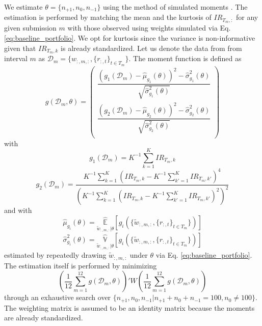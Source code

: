 \documentclass[3p,times,twocolumn]{elsarticle}
\begin{document}
We estimate $\theta=\{ n_{+1}, n_{0}, n_{-1}\}$ using the method of simulated moments \citep{mcfaddenMethodSimulatedMoments1989}.
The estimation is performed by matching the mean and the kurtosis of $IR_{T_{m},:}$ for any given submission $m$ with those observed using weights simulated via Eq. \ref{eq:baseline_portfolio}.
We opt for kurtosis since the variance is non-informative given that $IR_{T_{m},k}$ is already standardized.
Let us denote the data from from interval $m$ as $\mathcal{D}_{m}=\{w_{:,m,:}, \{r_{:,t}\}_{t\in T_{m}}\}$.
The moment function is defined as
\begin{equation}
    g(\mathcal{D}_{m},\theta)=
    \begin{pmatrix}
        \dfrac{\left(g_{1}(\mathcal{D}_{m})- \hat{\mu}_{g_{1}}(\theta)\right)^2 - \hat{\sigma}^{2}_{g_{1}}(\theta)}{\sqrt{\hat{\sigma}^{2}_{g_{1}}(\theta)}} \\
        \dfrac{\left(g_{2}(\mathcal{D}_{m})- \hat{\mu}_{g_{2}}(\theta)\right)^2 - \hat{\sigma}^{2}_{g_{2}}(\theta)}{\sqrt{\hat{\sigma}^{2}_{g_{2}}(\theta)}} \\
    \end{pmatrix}
\end{equation}
with
\begin{equation}
    g_{1}(\mathcal{D}_{m}) = K^{-1}\sum_{k=1}^{K}IR_{T_{m},k}
\end{equation}
\begin{equation}
    g_{2}(\mathcal{D}_{m}) = \frac{K^{-1}\sum_{k=1}^{K}(IR_{T_{m},k}-K^{-1}\sum_{k'=1}^{K}IR_{T_{m},k'})^{4}}{\left(K^{-1}\sum_{k=1}^{K}(IR_{T_{m},k}-K^{-1}\sum_{k'=1}^{K}IR_{T_{m},k'})^{2}\right)^{2}}
\end{equation}
and with
\begin{equation}
    \hat{\mu}_{g_{i}}(\theta)=\underset{\tilde{w}_{:,m,:}|\theta}{\widehat{\mathbb{E}}}[g_{i}(\{\tilde{w}_{:,m,:}, \{r_{:,t}\}_{t\in T_{m}}\})]
\end{equation}
\begin{equation}
    \hat{\sigma}_{g_{i}}^{2}(\theta)=\underset{\tilde{w}_{:,m,:}|\theta}{\widehat{\mathbb{V}}}[g_{i}(\{\tilde{w}_{:,m,:}, \{r_{:,t}\}_{t\in T_{m}}\})]
\end{equation}
estimated by repeatedly drawing $\tilde{w}_{:,m,:}$ under $\theta$ via Eq. \ref{eq:baseline_portfolio}.
The estimation itself is performed by minimizing
\begin{equation}
    \left(\dfrac{1}{12}\sum_{m=1}^{12}g(\mathcal{D}_{m},\theta)\right)' W \left(\dfrac{1}{12}\sum_{m=1}^{12}g(\mathcal{D}_{m},\theta)\right)
\end{equation}
through an exhaustive search over $\{n_{+1}, n_{0}, n_{-1}|n_{+1}+n_{0}+n_{-1}=100, n_{0} \neq 100\}$.
The weighting matrix is assumed to be an identity matrix because the moments are already standardized.
\end{document}

